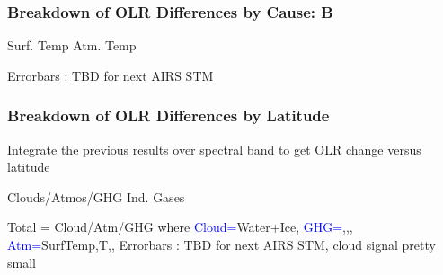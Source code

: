 \documentclass[10pt,t]{beamer}
\begin{document}
\begin{frame}
  \frametitle{Breakdown of OLR Differences by Cause: B}
  \hspace{0.50in} Surf. Temp  \hspace{1.5in} Atm. Temp \\
  \begin{center}
  \end{center}
 Errorbars : TBD for next AIRS STM
\end{frame}

\begin{frame}
  \frametitle{Breakdown of OLR Differences by Latitude}
  Integrate the previous results over spectral band to get OLR change versus latitude
  
  \hspace{0.50in} Clouds/Atmos/GHG  \hspace{1.5in} Ind. Gases \\
  \begin{center}
  \end{center}
 Total = Cloud/Atm/GHG where \newline
 \textcolor{blue}{Cloud=}Water+Ice, \textcolor{blue}{GHG=}\cd,\methane,\nitrous, \textcolor{blue}{Atm=}SurfTemp,T,\water,\ozone \newline
 Errorbars : TBD for next AIRS STM, cloud signal pretty small
\end{frame}
\end{document}
